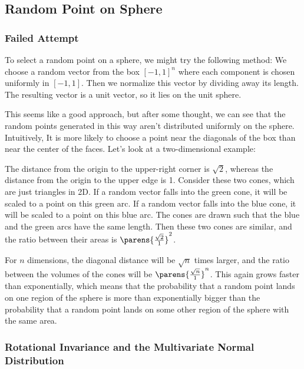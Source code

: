 \documentclass{article}
\begin{document}
\subsection{Random Point on Sphere}

\subsubsection{Failed Attempt}


To select a random point on a sphere, we might try the following method: We choose a random vector from the box $[-1, 1]^n$ where each component is chosen uniformly in $[-1, 1]$. Then we normalize this vector by dividing away its length. The resulting vector is a unit vector, so it lies on the unit sphere.

This seems like a good approach, but after some thought, we can see that the random points generated in this way aren't distributed uniformly on the sphere. Intuitively, It is more likely to choose a point near the diagonals of the box than near the center of the faces. Let's look at a two-dimensional example:


The distance from the origin to the upper-right corner is $\sqrt{2}$, whereas the distance from the origin to the upper edge is 1. Consider these two cones, which are just triangles in 2D. If a random vector falls into the green cone, it will be scaled to a point on this green arc. If a random vector falls into the blue cone, it will be scaled to a point on this blue arc. The cones are drawn such that the blue and the green arcs have the same length. Then these two cones are similar, and the ratio between their areas is $\parens{\frac{\sqrt{2}}{1}}^2$.

For $n$ dimensions, the diagonal distance will be $\sqrt{n}$ times larger, and the ratio between the volumes of the cones will be $\parens{\frac{\sqrt{n}}{1}}^n$. This again grows faster than exponentially, which means that the probability that a random point lands on one region of the sphere is more than exponentially bigger than the probability that a random point lands on some other region of the sphere with the same area.

\subsubsection{Rotational Invariance and the Multivariate Normal Distribution}
\end{document}
